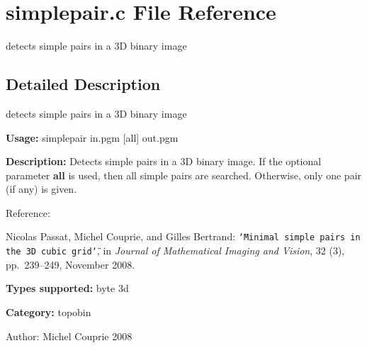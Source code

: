 \section{simplepair.c File Reference}
\label{simplepair_8c}
detects simple pairs in a 3D binary image  




\label{_details}
\subsection{Detailed Description}
detects simple pairs in a 3D binary image 

{\bf Usage:} simplepair in.pgm [all] out.pgm

{\bf Description:} Detects simple pairs in a 3D binary image. If the optional parameter {\bf all} is used, then all simple pairs are searched. Otherwise, only one pair (if any) is given.

Reference:\par
 [PCB08] Nicolas Passat, Michel Couprie, and Gilles Bertrand: {\tt \char`\"{}Minimal simple pairs in the 3D cubic grid\char`\"{}}, in {\em Journal of Mathematical Imaging and Vision\/}, 32 (3), pp.~239–249, November 2008.\par


{\bf Types supported:} byte 3d

{\bf Category:} topobin

\begin{Desc}
\item[Author:]Michel Couprie 2008 \end{Desc}

